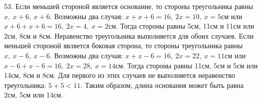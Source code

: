 53. Если меньшей стороной является основание, то стороны треугольника равны $x,\ x+6,\ x+6.$ Возможны два случая: $x+x+6=16,\ 2x=10,\ x=5$см или $x+6+x+6=16,\ 2x=4,\ x=2$см. Тогда стороны равны 5см, 11см и 11см или 2см, 8см и 8см. Неравенство треугольника выполняется для обоих случаев. Если меньшей стороной является боковая сторона, то стороны треугольника равны $x,\ x-6,\ x-6.$ Возможны два случая: $x+x-6=16,\ 2x=22,\ x=11$см или $x-6+x-6=16,\ 2x=28,\ x=14$см. Тогда стороны равны 11см, 5см и 5см или 14см, 8см и 8см. Для первого из этих случаев не выполняется неравенство треугольника: $5+5<11.$ Таким образом, длина основания может быть равна 2см, 5см или 14см.\\
